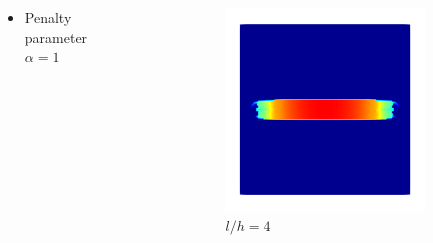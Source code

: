 \begin{frame}
\begin{columns}
\begin{column}{0.4\textwidth}
\begin{itemize}
\begin{itemize}
                        \item Penalty parameter $\alpha = 1$
                    \end{itemize}
            \end{itemize}
        \end{column}
        \vrule{}
        \begin{column}{0.6\textwidth}
            \begin{figure}
                \centering
                \begin{subfigure}{0.32\textwidth}
                    \centering
                    \includegraphics[width=\textwidth]{results/figures/structured_w_4.png}
                    \caption{$l/h = 4$}
                \end{subfigure}
                \begin{subfigure}{0.32\textwidth}
                    \centering

\end{subfigure}
\end{figure}
\end{column}
\end{columns}
\end{frame}

